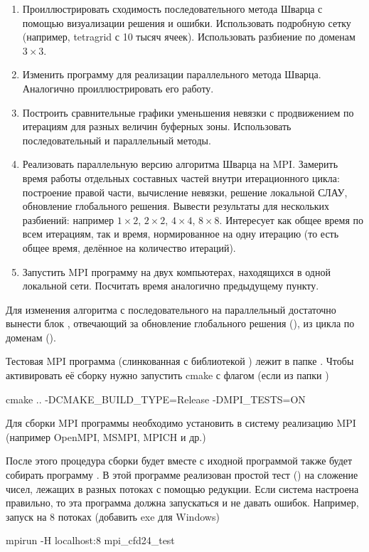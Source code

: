 \begin{enumerate}
\item Проиллюстрировать сходимость последовательного метода Шварца с помощью визуализации решения и ошибки. Использовать подробную сетку (например, tetragrid с 10 тысяч ячеек).
      Использовать разбиение по доменам $3\times3$.
\item Изменить программу для реализации параллельного метода Шварца. Аналогично проиллюстрировать его работу.
\item Построить сравнительные графики уменьшения невязки с продвижением по итерациям для разных величин буферных зоны. Использовать последовательный и параллельный методы.
\item Реализовать параллельную версию алгоритма Шварца на MPI. Замерить время работы отдельных составных частей внутри итерационного цикла: построение правой части, вычисление невязки, решение локальной СЛАУ, обновление глобального решения. Вывести результаты для нескольких разбиений: например $1\times2$, $2\times2$, $4\times4$, $8\times8$. Интересует как общее время по всем итерациям, так и время, нормированное на одну итерацию (то есть общее время, делённое на количество итераций).
\item Запустить MPI программу на двух компьютерах, находящихся в одной локальной сети. Посчитать время аналогично предыдущему пункту.
\end{enumerate}

Для изменения алгоритма с последовательного на параллельный достаточно вынести блок , отвечающий за обновление глобального решения (),
из цикла по доменам ().

Тестовая MPI программа (слинкованная с библиотекой ) лежит в папке .
Чтобы активировать её сборку нужно запустить cmake с флагом (если из папки )
\begin{bashcode}
cmake .. -DCMAKE_BUILD_TYPE=Release -DMPI_TESTS=ON
\end{bashcode}
Для сборки MPI программы необходимо установить в систему реализацию MPI (например OpenMPI, MSMPI, MPICH и др.)

После этого процедура сборки будет вместе с иходной программой  также будет собирать программу .
В этой программе реализован простой тест () на сложение чисел, лежащих в разных потоках с помощью редукции.
Если система настроена правильно, то эта программа должна запускаться и не давать ошибок. Например, запуск на 8 потоках (добавить exe для Windows)
\begin{bashcode}
mpirun -H localhost:8 mpi_cfd24_test 
\end{bashcode}

